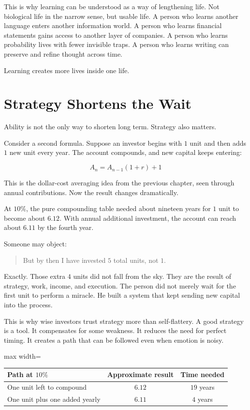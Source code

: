 This is why learning can be understood as a way of lengthening life. Not biological life in the narrow sense, but usable life. A person who learns another language enters another information world. A person who learns financial statements gains access to another layer of companies. A person who learns probability lives with fewer invisible traps. A person who learns writing can preserve and refine thought across time.

Learning creates more lives inside one life.

\section*{Strategy Shortens the Wait}

Ability is not the only way to shorten long term. Strategy also matters.

Consider a second formula. Suppose an investor begins with \(1\) unit and then adds \(1\) new unit every year. The account compounds, and new capital keeps entering:

\[
A_n=A_{n-1}(1+r)+1
\]

This is the dollar-cost averaging idea from the previous chapter, seen through annual contributions. Now the result changes dramatically.

At \(10\%\), the pure compounding table needed about nineteen years for \(1\) unit to become about \(6.12\). With annual additional investment, the account can reach about \(6.11\) by the fourth year.

Someone may object:

\begin{quote}
But by then I have invested \(5\) total units, not \(1\).
\end{quote}

Exactly. Those extra \(4\) units did not fall from the sky. They are the result of strategy, work, income, and execution. The person did not merely wait for the first unit to perform a miracle. He built a system that kept sending new capital into the process.

This is why wise investors trust strategy more than self-flattery. A good strategy is a tool. It compensates for some weakness. It reduces the need for perfect timing. It creates a path that can be followed even when emotion is noisy.

\begin{center}
\begin{adjustbox}{max width=\linewidth}
\begin{tabular}{lcc}
\hline
Path at \(10\%\) & Approximate result & Time needed \\
\hline
One unit left to compound & \(6.12\) & \(19\) years \\
One unit plus one added yearly & \(6.11\) & \(4\) years \\
\hline
\end{tabular}
\end{adjustbox}
\end{center}

